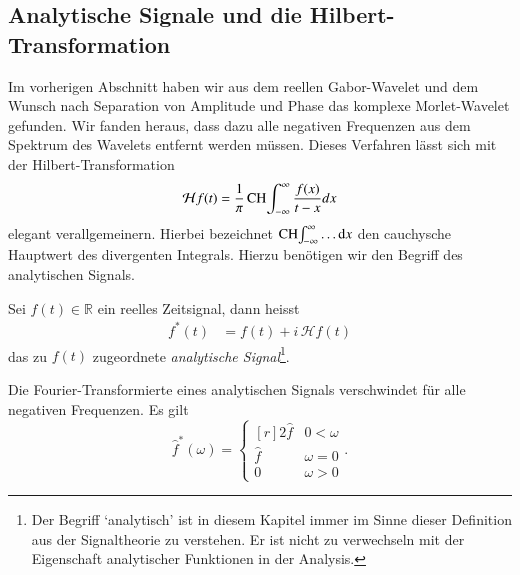 \subsection{Analytische Signale und die Hilbert-Transformation}
Im vorherigen Abschnitt haben wir aus dem reellen Gabor-Wavelet und dem Wunsch nach Separation von Amplitude und Phase das komplexe Morlet-Wavelet gefunden.
Wir fanden heraus, dass dazu alle negativen Frequenzen aus dem Spektrum des Wavelets entfernt werden müssen.
Dieses Verfahren lässt sich mit der Hilbert-Transformation
\[
	\mathcal{H}f(t) =
	\frac{1}{\pi} \CH\int_{-\infty}^{\infty}\frac{f(x)}{t-x} dx
\]
elegant verallgemeinern.
Hierbei bezeichnet $\CH\int_{-\infty}^{\infty} \dots \mathrm{d}x$ den cauchysche Hauptwert des divergenten Integrals.
Hierzu benötigen wir den Begriff des analytischen Signals.
\begin{definition}
	Sei $f(t) \in \mathbb{R}$ ein reelles Zeitsignal, dann heisst
	\begin{align*}
		f^\ast(t) 
		&= f(t) + i\,\mathcal{H}f(t)
	\end{align*}
	das zu $f(t)$ zugeordnete \emph{analytische Signal}\footnote{Der Begriff `analytisch' ist in diesem Kapitel immer im Sinne dieser Definition aus der Signaltheorie zu verstehen.
	Er ist nicht zu verwechseln mit der Eigenschaft analytischer Funktionen in der Analysis.
	}.
\end{definition}

\begin{satz}
	Die Fourier-Transformierte eines analytischen Signals verschwindet für alle negativen Frequenzen.
	Es gilt
	\[
		\hat{f}^\ast(\omega) = \left\lbrace\begin{matrix*}[r]	
			2\hat{f} & 0 < \omega \\ \hat{f} & \omega= 0 \\ 0 & \omega > 0\end{matrix*} \right..
	\]
\end{satz}

